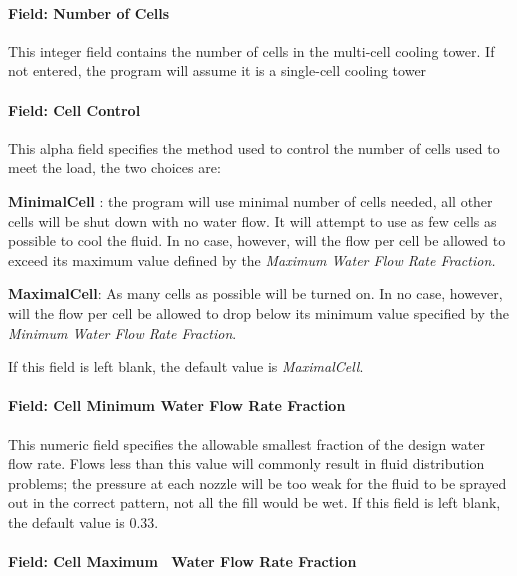 \paragraph{Field: Number of Cells}\label{field-number-of-cells}

This integer field contains the number of cells in the multi-cell cooling tower. If not entered, the program will assume it is a single-cell cooling tower

\paragraph{Field: Cell Control}\label{field-cell-control}

This alpha field specifies the method used to control the number of cells used to meet the load, the two choices are:

\textbf{MinimalCell} : the program will use minimal number of cells needed, all other cells will be shut down with no water flow. It will attempt to use as few cells as possible to cool the fluid. In no case, however, will the flow per cell be allowed to exceed its maximum value defined by the \emph{Maximum Water Flow Rate Fraction.}

\textbf{MaximalCell}: As many cells as possible will be turned on. In no case, however, will the flow per cell be allowed to drop below its minimum value specified by the \emph{Minimum Water Flow Rate Fraction}.

If this field is left blank, the default value is \textit{MaximalCell}.

\paragraph{Field: Cell Minimum Water Flow Rate Fraction}\label{field-cell-minimum-water-flow-rate-fraction}

This numeric field specifies the allowable smallest fraction of the design water flow rate. Flows less than this value will commonly result in fluid distribution problems; the pressure at each nozzle will be too weak for the fluid to be sprayed out in the correct pattern, not all the fill would be wet. If this field is left blank, the default value is 0.33.

\paragraph{Field: Cell Maximum~ Water Flow Rate Fraction}\label{field-cell-maximum-water-flow-rate-fraction}

